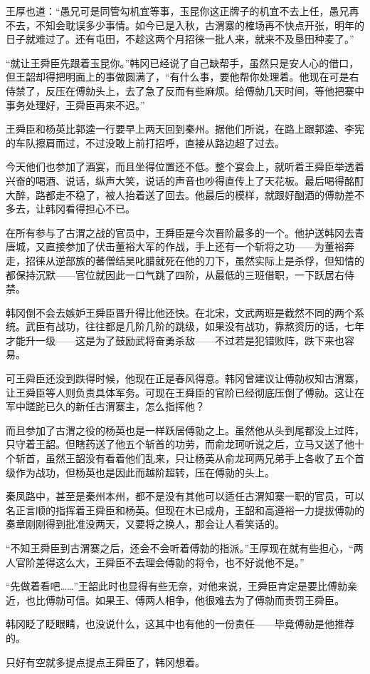 王厚也道：“愚兄可是同管勾机宜等事，玉昆你这正牌子的机宜不去上任，愚兄再不去，不知会耽误多少事情。如今已是入秋，古渭寨的榷场再不快点开张，明年的日子就难过了。还有屯田，不趁这两个月招徕一批人来，就来不及垦田种麦了。”

“就让王舜臣先跟着玉昆你。”韩冈已经说了自己缺帮手，虽然只是安人心的借口，但王韶却得把明面上的事做圆满了，“有什么事，要他帮你处理着。他现在可是右侍禁了，反压在傅勍头上，去了急了反而有些麻烦。给傅勍几天时间，等他把寨中事务处理好，王舜臣再来不迟。”

王舜臣和杨英比郭逵一行要早上两天回到秦州。据他们所说，在路上跟郭逵、李宪的车队擦肩而过，不过没敢上前打招呼，直接从路边超了过去。

今天他们也参加了酒宴，而且坐得位置还不低。整个宴会上，就听着王舜臣举透着兴奋的喝酒、说话，纵声大笑，说话的声音也吵得直传上了天花板。最后喝得酩酊大醉，路都走不稳了，被人抬着送了回去。他最后的模样，就跟好酗酒的傅勍差不多去，让韩冈看得担心不已。

在所有参与了古渭之战的官员中，王舜臣是今次晋阶最多的一个。他护送韩冈去青唐城，又直接参加了伏击董裕大军的作战，手上还有一个斩将之功——为董裕奔走，招徕从逆部族的蕃僧结吴叱腊就死在他的刀下，虽然实际上是杀俘，但知情的都保持沉默——官位就因此一口气跳了四阶，从最低的三班借职，一下跃居右侍禁。

韩冈倒不会去嫉妒王舜臣晋升得比他还快。在北宋，文武两班是截然不同的两个系统。武臣有战功，往往都是几阶几阶的跳级，如果没有战功，靠熬资历的话，七年才能升一级——这是为了鼓励武将奋勇杀敌——不过若是犯错败阵，跌下来也容易。

可王舜臣还没到跌得时候，他现在正是春风得意。韩冈曾建议让傅勍权知古渭寨，让王舜臣等人则负责具体军务。可现在王舜臣的官阶已经彻底压倒了傅勍。这让在军中蹉跎已久的新任古渭寨主，怎么指挥他？

而且参加了古渭之役的杨英也是一样跃居傅勍之上。虽然他从头到尾都没上过阵，只守着王韶。但瞎药送了他五个斩首的功劳，而俞龙珂听说之后，立马又送了他十个斩首，虽然王韶没有看着他们乱来，只让杨英从俞龙珂两兄弟手上各收了五个首级作为战功，但杨英也是因此而越阶超转，压在傅勍的头上。

秦凤路中，甚至是秦州本州，都不是没有其他可以适任古渭知寨一职的官员，可以名正言顺的指挥着王舜臣和杨英。但现在木已成舟，王韶和高遵裕一力提拔傅勍的奏章刚刚得到批准没两天，又要将之换人，那会让人看笑话的。

“不知王舜臣到古渭寨之后，还会不会听着傅勍的指派。”王厚现在就有些担心，“两人官阶差得这么大，王舜臣不去理会傅勍的将令，也不好说他不是。”

“先做着看吧……”王韶此时也显得有些无奈，对他来说，王舜臣肯定是要比傅勍亲近，也比傅勍可信。如果王、傅两人相争，他很难去为了傅勍而责罚王舜臣。

韩冈眨了眨眼睛，也没说什么，这其中也有他的一份责任——毕竟傅勍是他推荐的。

只好有空就多提点提点王舜臣了，韩冈想着。

